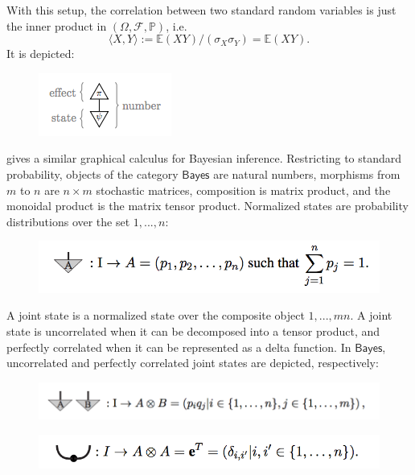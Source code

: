 \documentclass{sig-alternate-05-2015}
\theoremstyle{plain}
\theoremstyle{plain}
\theoremstyle{remark}
\newcommand{\Cat}[1]{\mathsf{#1}}
\def\Bayes{\Cat{Bayes}}
\begin{document}
With this setup, the correlation between two standard random variables is just the inner product in $(\Omega, \mathcal{F}, \mathbb{P})$, i.e. \[\langle X, Y \rangle := \mathbb{E}(XY) / (\sigma_X \sigma_Y) = \mathbb{E}(XY).\] It is depicted:
\begin{figure}[h!]
\centering
\includegraphics{innerproduct}
\end{figure}

\cite{coecke_spekkens} gives a similar graphical calculus for Bayesian inference. Restricting to standard probability, objects of the category $\Bayes$ are natural numbers, morphisms from $m$ to $n$ are $n \times m$ stochastic matrices, composition is matrix product, and the monoidal product is the matrix tensor product. Normalized states are probability distributions over the set ${1, ..., n}$:

\begin{figure}[h!]
\centering
\label{bob_normalized_state}
\includegraphics[width=\linewidth]{bob_normalized_state}
\end{figure}

A joint state is a normalized state over the composite object ${1, ..., mn}$. A joint state is uncorrelated when it can be decomposed into a tensor product, and perfectly correlated when it can be represented as a delta function. In $\Bayes$, uncorrelated and perfectly correlated joint states are depicted, respectively:

\begin{figure}[h!]
\centering
\label{bob_uncorrelated_state}
\includegraphics[width=\linewidth]{bob_uncorrelated_state}
\end{figure}

\begin{figure}[h!]
\centering
\label{bob_correlated_state}
\includegraphics[width=\linewidth]{bob_correlated_state}
\end{figure}
\end{document}
